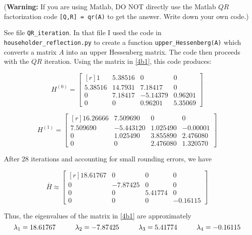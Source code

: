\documentclass[11pt,oneside,english,reqno]{amsart}
\theoremstyle{definition}
\newcommand{\pspace}{\hspace{10mm}}
\newcommand{\1}{\mathbbm{1}}
\begin{document}
\begin{enumerate}[leftmargin=*]
(\textbf{Warning:} If you are using Matlab, DO NOT directly use the Matlab $QR$ factorization code \verb![Q,R] = qr(A)! to get the answer. Write down your own code.)

See file \verb!QR_iteration!. In that file I used the code in \verb!householder_reflection.py! to create a function \verb!upper_Hessenberg(A)! which converts a matrix $A$ into an upper Hessenberg matrix. The code then proceeds with the $QR$ iteration. Using the matrix in \ref{4b1}, this code produces:

\begin{equation}
H^{(0)}=\begin{bmatrix*}[r]
1   &    5.38516 &  0   &     0   \\[2mm]
 5.38516 & 14.7931 &   7.18417 &  0     \\[2mm]
 0    &    7.18417 & -5.14379 &  0.96201\\[2mm]
 0   &     0   &     0.96201 &  5.35069
\end{bmatrix*}
\end{equation}

\begin{equation}
H^{(1)}=\begin{bmatrix*}[r]
  16.26666 &  7.509690 & 0 & 0\\[2mm]
  7.509690 & -5.443120 &  1.025490 & -0.00001\\[2mm]
  0  & 1.025490 &  3.855890 & 2.476080\\[2mm]
  0 &  0 & 2.476080 &  1.320570
\end{bmatrix*}
\end{equation}

After 28 iterations and accounting for small rounding errors, we have

\begin{equation}
\bar H \approx\begin{bmatrix*}[r]
18.61767 & 0 & 0 & 0\\[2mm]
0 & -7.87425 & 0 & 0\\[2mm]
0 & 0 & 5.41774 & 0\\[2mm]
0 & 0 & 0 & -0.16115
\end{bmatrix*}
\end{equation}

Thus, the eigenvalues of the matrix in \ref{4b1} are approximately
\begin{equation}
\lambda_1 =18.61767 \pspace \lambda_2 = -7.87425 \pspace \lambda_3 = 5.41774 \pspace \lambda_4=-0.16115
\end{equation}



\end{enumerate}
\end{document}

